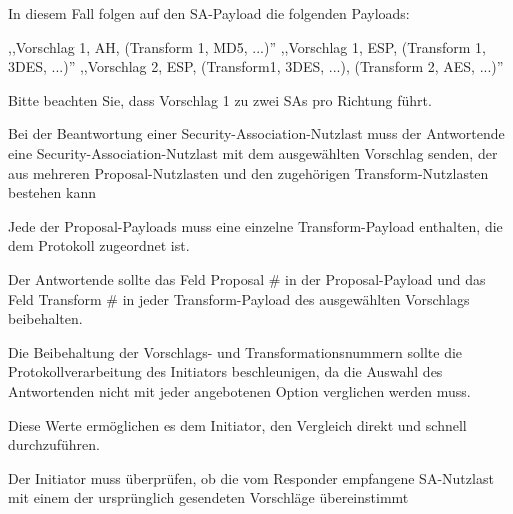 \documentclass[a4paper]{article}
\begin{document}
\begin{multicols}{3}
\begin{itemize*}
\begin{itemize*}
\begin{itemize*}
                        \item In diesem Fall folgen auf den SA-Payload die folgenden Payloads:
                        \begin{itemize*} \item ,,Vorschlag 1, AH, (Transform 1, MD5, ...)'' ,,Vorschlag 1, ESP, (Transform 1, 3DES, ...)'' ,,Vorschlag 2, ESP, (Transform1, 3DES, ...), (Transform 2, AES, ...)'' \end{itemize*}
                        \item Bitte beachten Sie, dass Vorschlag 1 zu zwei SAs pro Richtung führt.
                  \end{itemize*}
                  \item Bei der Beantwortung einer Security-Association-Nutzlast muss der
                  Antwortende eine Security-Association-Nutzlast mit dem ausgewählten
                  Vorschlag senden, der aus mehreren Proposal-Nutzlasten und den
                  zugehörigen Transform-Nutzlasten bestehen kann
                  \item Jede der Proposal-Payloads muss eine einzelne Transform-Payload
                  enthalten, die dem Protokoll zugeordnet ist.
                  \item Der Antwortende sollte das Feld Proposal \# in der Proposal-Payload
                  und das Feld Transform \# in jeder Transform-Payload des ausgewählten
                  Vorschlags beibehalten.
                  \begin{itemize*}
                        \item Die Beibehaltung der Vorschlags- und Transformationsnummern sollte die Protokollverarbeitung des Initiators beschleunigen, da die Auswahl des Antwortenden nicht mit jeder angebotenen Option verglichen werden muss.
                        \item Diese Werte ermöglichen es dem Initiator, den Vergleich direkt und schnell durchzuführen.
                  \end{itemize*}
                  \item Der Initiator muss überprüfen, ob die vom Responder empfangene
                  SA-Nutzlast mit einem der ursprünglich gesendeten Vorschläge
                  übereinstimmt
            \end{itemize*}


\end{itemize*}
\end{multicols}
\end{document}
